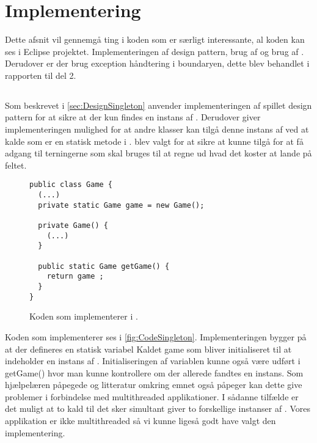 \chapter{Implementering}\label{chap:Implementering}
Dette afsnit vil gennemgå ting i koden som er særligt interessante, al koden kan ses i Eclipse projektet. Implementeringen af  design pattern, brug af  og brug af . Derudover er der brug exception håndtering i boundaryen, dette blev behandlet i rapporten til del 2.

\section{}
Som beskrevet i \vref{sec:DesignSingleton} anvender implementeringen af spillet  design pattern for at sikre at der kun findes en instans af . Derudover giver implementeringen mulighed for at andre klasser kan tilgå denne instans af  ved at kalde  som er en statisk metode i .  blev valgt for at sikre at  kunne tilgå  for at få adgang til terningerne som skal bruges til at regne ud hvad det koster at lande på feltet.

\begin{figure}
\caption{Koden som implementerer  i .}
\label{fig:CodeSingleton}
\centering
\begin{lstlisting}
public class Game {
  (...)
  private static Game game = new Game();

  private Game() {
    (...)
  }

  public static Game getGame() {
    return game ;
  }
}
\end{lstlisting}
\end{figure}

Koden som implementerer  ses i \vref{fig:CodeSingleton}. Implementeringen bygger på at der defineres en statisk variabel Kaldet game som bliver initialiseret til at indeholder en instans af . Initialiseringen af variablen kunne også være udført i getGame() hvor man kunne kontrollere om der allerede fandtes en instans. Som hjælpelæren påpegede og litteratur omkring emnet også påpeger kan dette give problemer i forbindelse med multithreaded applikationer. I sådanne tilfælde er det muligt at to kald til  det sker simultant giver to forskellige instanser af . Vores applikation er ikke multithreaded så vi kunne ligeså godt have valgt den implementering.

